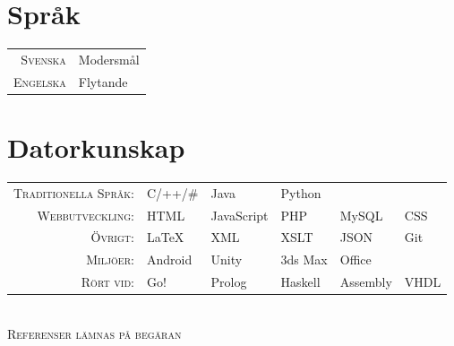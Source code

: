 \documentclass[a4paper,10pt]{article}
\begin{document}
\section{Språk}
\begin{tabular}{Dl}
\textsc{Svenska}		&	Modersmål\\
\textsc{Engelska}		&	Flytande\\
\end{tabular}

\section{Datorkunskap}
\def\arraystretch{1.2}%
\begin{tabu}to \textwidth{r X[c] X[c] X[c] X[c] X[c]}
\textsc{Traditionella Språk:}	&	C/++/\#	&	 Java		&	Python	&			&		\\
\textsc{Webbutveckling:}		&	 HTML		& 	JavaScript	&	PHP		&	MySQL	& 	CSS	\\
\textsc{Övrigt:}			& 	LaTeX		&	XML		&	XSLT		&	JSON		&	 Git	\\
\textsc{Miljöer:}			&	Android	& 	Unity		&	3ds Max	&	Office		&		\\
\textsc{Rört vid: }			&	Go!		&	 Prolog	&	Haskell	&	Assembly	&	 VHDL
\end{tabu}
\\[0.3cm]

\centering\textsc{ Referenser lämnas på begäran}
\end{document}
